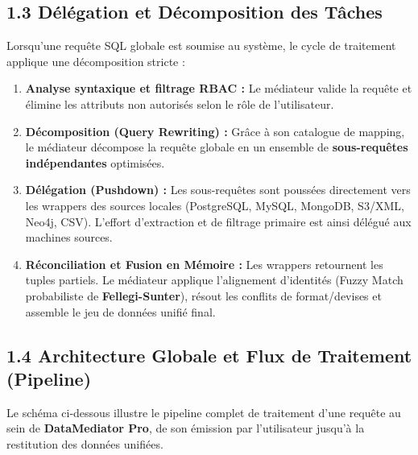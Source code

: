 \documentclass[11pt,a4paper]{article}
\begin{document}
\subsection{1.3 Délégation et Décomposition des Tâches}
Lorsqu'une requête SQL globale est soumise au système, le cycle de traitement applique une décomposition stricte :
\begin{enumerate}
    \item \textbf{Analyse syntaxique et filtrage RBAC :} Le médiateur valide la requête et élimine les attributs non autorisés selon le rôle de l'utilisateur.
    \item \textbf{Décomposition (Query Rewriting) :} Grâce à son catalogue de mapping, le médiateur décompose la requête globale en un ensemble de \textbf{sous-requêtes indépendantes} optimisées.
    \item \textbf{Délégation (Pushdown) :} Les sous-requêtes sont poussées directement vers les wrappers des sources locales (PostgreSQL, MySQL, MongoDB, S3/XML, Neo4j, CSV). L'effort d'extraction et de filtrage primaire est ainsi délégué aux machines sources.
    \item \textbf{Réconciliation et Fusion en Mémoire :} Les wrappers retournent les tuples partiels. Le médiateur applique l'alignement d'identités (Fuzzy Match probabiliste de \textbf{Fellegi-Sunter}), résout les conflits de format/devises et assemble le jeu de données unifié final.
\end{enumerate}

\subsection{1.4 Architecture Globale et Flux de Traitement (Pipeline)}

Le schéma ci-dessous illustre le pipeline complet de traitement d'une requête au sein de \textbf{DataMediator Pro}, de son émission par l'utilisateur jusqu'à la restitution des données unifiées.
\end{document}
